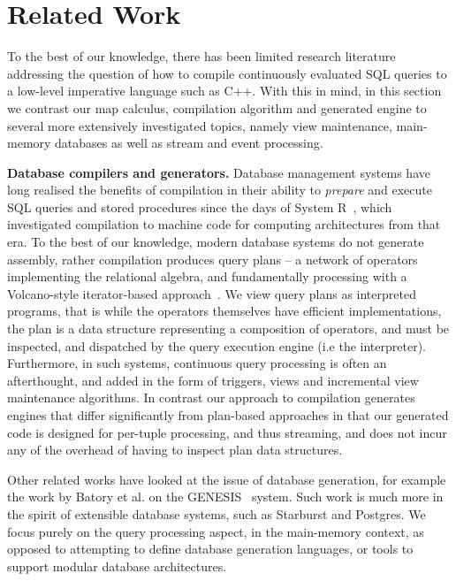\section{Related Work}

To the best of our knowledge, there has been limited research literature
addressing the question of how to compile continuously evaluated SQL queries to
a low-level imperative language such as C++.  With this in mind, in this section
we contrast our map calculus, compilation algorithm and generated engine to
several more extensively investigated topics, namely view maintenance,
main-memory databases as well as stream and event processing.

\textbf{Database compilers and generators.}
Database management systems have long realised the benefits of compilation in
their ability to \textit{prepare} and execute SQL queries and stored procedures
since the days of System R~\cite{chamberlin-tods:01}, which investigated
compilation to machine code for computing architectures from that era. To the
best of our knowledge, modern database systems do not generate assembly, rather
compilation produces query plans -- a network of operators implementing the
relational algebra, and fundamentally processing with a Volcano-style
iterator-based approach~\cite{graefe-tkde:94}. We view query plans as
interpreted programs, that is while the operators themselves have efficient
implementations, the plan is a data structure representing a composition of
operators, and must be inspected, and dispatched by the query execution engine
(i.e the interpreter). 
Furthermore, in such systems, continuous query processing
is often an afterthought, and added in the form of triggers, views and
incremental view maintenance algorithms. In contrast our approach to compilation
generates engines that differ significantly from plan-based approaches in that
our generated code is designed for per-tuple processing, and thus streaming, and
does not incur any of the overhead of having to inspect plan data structures.

Other related works have looked at the issue of database generation, for example
the work by Batory et al. on the GENESIS~\cite{batory-tse:88} system. Such work
is much more in the spirit of extensible database systems, such as Starburst and
Postgres. We focus purely on the query processing aspect, in the main-memory
context, as opposed to attempting to define database generation languages, or
tools to support modular database architectures.


